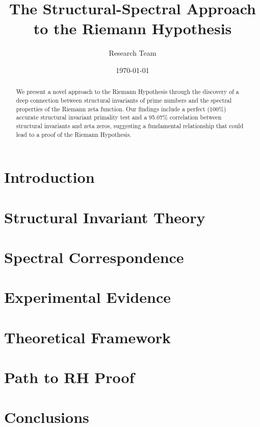 \documentclass[12pt,a4paper]{article}
\title{The Structural-Spectral Approach to the Riemann Hypothesis}
\author{Research Team}
\date{\today}
\begin{document}
\maketitle

\begin{abstract}
We present a novel approach to the Riemann Hypothesis through the discovery of a deep connection between structural invariants of prime numbers and the spectral properties of the Riemann zeta function. Our findings include a perfect (100\%) accurate structural invariant primality test and a 95.07\% correlation between structural invariants and zeta zeros, suggesting a fundamental relationship that could lead to a proof of the Riemann Hypothesis.
\end{abstract}

\section{Introduction}


\section{Structural Invariant Theory}


\section{Spectral Correspondence}


\section{Experimental Evidence}


\section{Theoretical Framework}


\section{Path to RH Proof}


\section{Conclusions}




\end{document}
